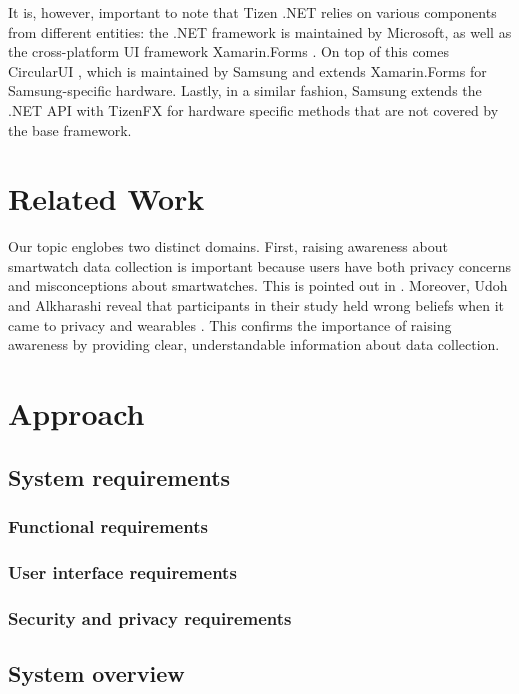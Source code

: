 \documentclass[conference, a4paper, 10pt, twocolumn]{IEEEtran}
\begin{document}
It is, however, important to note that Tizen .NET relies on various components from different entities: the .NET framework \cite{dotnet} is maintained by Microsoft, as well as the cross-platform UI framework Xamarin.Forms \cite{xamarin}. On top of this comes CircularUI \cite{circularUI}, which is maintained by Samsung and extends Xamarin.Forms for Samsung-specific hardware. Lastly, in a similar fashion, Samsung extends the .NET \ac{API} with TizenFX \cite{tizenFX} for hardware specific methods that are not covered by the base framework.

\section{Related Work}\label{related}
Our topic englobes two distinct domains. First, raising awareness about smartwatch data collection is important because users have both privacy concerns and misconceptions about smartwatches. This is pointed out in \cite{datta2018survey,motti2015users,udoh2016privacy}. Moreover, Udoh and Alkharashi reveal that participants in their study held wrong beliefs when it came to privacy and wearables \cite{udoh2016privacy}. This confirms the importance of raising awareness by providing clear, understandable information about data collection.

\section{Approach}\label{approach}

\subsection{System requirements}

\subsubsection{Functional requirements}
\subsubsection{User interface requirements}
\subsubsection{Security and privacy requirements}

\subsection{System overview}
\end{document}
